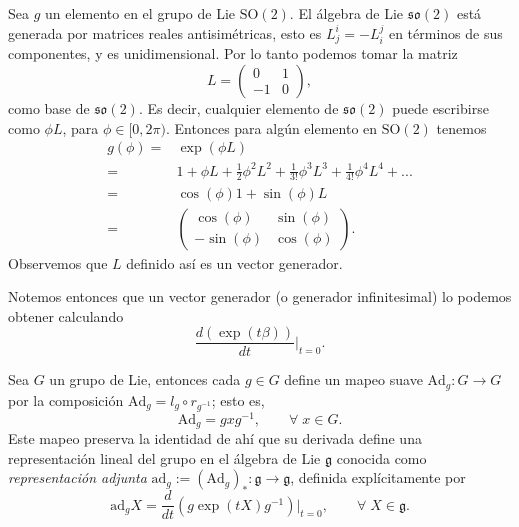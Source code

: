\begin{ex}
Sea $g$ un elemento en el grupo de Lie $\mathrm{SO}(2)$. El \'{a}lgebra de Lie $\mathfrak{so}(2)$ est\'{a} generada por matrices reales antisim\'{e}tricas, esto es $L^{i}_{j} = -L^{j}_{i}$ en t\'{e}rminos de sus componentes, y es unidimensional. Por lo tanto podemos tomar la matriz
%
\[L = 
 \begin{pmatrix}
  0 & 1 \\
  -1 & 0
 \end{pmatrix},
\]
%
como base de $\mathfrak{so}(2)$. Es decir, cualquier elemento de $\mathfrak{so}(2)$ puede escribirse como $\phi L$, para $\phi \in [0, 2 \pi)$. Entonces para alg\'{u}n elemento en $\mathrm{SO}(2)$  tenemos
%
\begin{align*}
g (\phi) = & \exp (\phi L) \\
= & 1 + \phi L + \frac{1}{2} \phi^{2} L^{2} + \frac{1}{3 !} \phi^{3} L^{3} + \frac{1}{4 !} \phi^{4} L^{4} + ... \\
= & \cos (\phi) 1 + \sin (\phi) L \\
= & \begin{pmatrix} \cos (\phi) & \sin (\phi) \\ -\sin (\phi) & \cos (\phi) \end{pmatrix}.
\end{align*}
%
Observemos que $L$ definido as\'{i} es un vector generador.
\end{ex}

\begin{obs}
Notemos entonces que un vector generador (o generador infinitesimal) lo podemos obtener calculando $$\frac{d (\exp (t \beta))}{dt} \bigg\vert_{t=0}.$$
\end{obs}

\begin{mydef} \cite{Warner}
Sea $G$ un grupo de Lie, entonces cada $g \in G$ define un mapeo suave $\mathrm{Ad}_{g}: G \rightarrow G$ por la composici\'{o}n $\mathrm{Ad}_{g} = l_{g} \circ r_{g^{-1}}$; esto es,
%
\begin{equation}
\mathrm{Ad}_{g} = g x g^{-1}, \qquad \forall \; x \in G.
\end{equation}
%
Este mapeo preserva la identidad de ah\'{i} que su derivada define una representaci\'{o}n lineal del grupo en el \'{a}lgebra de Lie $\mathfrak{g}$ conocida como \emph{representaci\'{o}n adjunta} $\mathrm{ad}_{g} := (\mathrm{Ad}_{g})_{*} : \mathfrak{g} \rightarrow \mathfrak{g}$, definida expl\'{i}citamente por
%
\begin{equation}
\mathrm{ad}_{g} X = \frac{d}{dt} \left(g \exp (t X) g^{-1} \right) \bigg\vert_{t=0}, \qquad \forall \; X \in \mathfrak{g}.
\end{equation}
%
\end{mydef}

